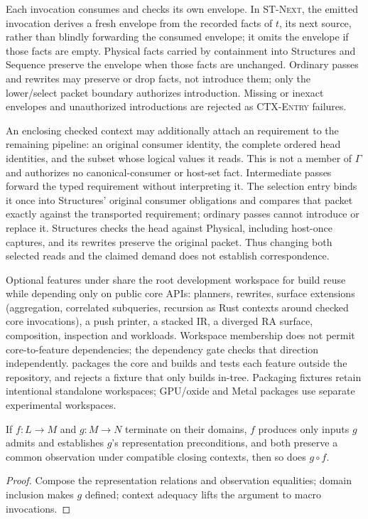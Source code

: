 Each invocation consumes and checks its own envelope. In \textsc{ST-Next},
the emitted invocation derives a fresh envelope from the recorded facts of
$t$, its next source, rather than blindly forwarding the consumed envelope;
it omits the envelope if those facts are empty. Physical facts carried by
containment into Structures and Sequence preserve the envelope when those
facts are unchanged. Ordinary passes and rewrites may preserve or drop facts,
not introduce them; only the lower/select packet boundary authorizes
introduction. Missing or inexact envelopes and unauthorized introductions
are rejected as \textsc{CTX-Entry} failures.

An enclosing checked context may additionally attach an
 requirement to the remaining pipeline: an original
consumer identity, the complete ordered head identities, and the subset whose
logical values it reads. This is not a member of $\Gamma$ and authorizes no
canonical-consumer or host-set fact. Intermediate passes forward the typed
requirement without interpreting it. The selection entry binds it once into
Structures' original consumer obligations and compares that packet exactly
against the transported requirement; ordinary passes cannot introduce or
replace it. Structures checks the head against Physical, including host-once
captures, and its rewrites preserve the original packet. Thus changing both
selected reads and the claimed demand does not establish correspondence.

Optional features under  share the root development workspace
for build reuse while depending only on public core APIs: planners, rewrites,
surface extensions (aggregation,
correlated subqueries, recursion as Rust contexts around checked
core invocations), a push printer, a stacked IR, a diverged RA surface,
composition, inspection and workloads. Workspace membership does not permit
core-to-feature dependencies; the dependency gate checks that direction
independently.  packages the core and builds and
tests each feature outside the repository, and rejects a fixture that only
builds in-tree. Packaging fixtures retain intentional standalone workspaces;
GPU/oxide and Metal packages use separate experimental workspaces.

\begin{theorem}
\label{thm:composition}
If $f:L\to M$ and $g:M\to N$ terminate on their domains, $f$ produces only inputs
$g$ admits and establishes $g$'s representation preconditions, and both preserve
a common observation under compatible closing contexts, then so does $g\circ f$.
\end{theorem}
\begin{proof}Compose the representation relations and observation equalities;
domain inclusion makes $g$ defined; context adequacy lifts the argument to macro
invocations.\end{proof}

